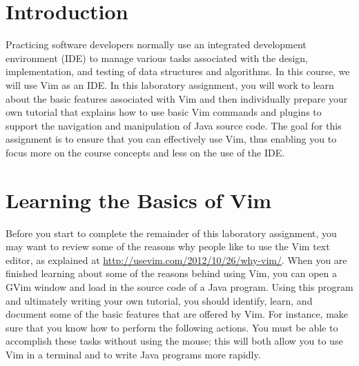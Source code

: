 


\usepackage[compact]{titlesec}



\section*{Introduction}

Practicing software developers normally use an integrated development environment (IDE) to manage various tasks
associated with the design, implementation, and testing of data structures and algorithms. In this course, we will use
Vim as an IDE.  In this laboratory assignment, you will work to learn about the basic features associated with Vim and
then individually prepare your own tutorial that explains how to use basic Vim commands and plugins to support the
navigation and manipulation of Java source code.  The goal for this assignment is to ensure that you can effectively use
Vim, thus enabling you to focus more on the course concepts and less on the use of the IDE.



\section*{Learning the Basics of Vim}

Before you start to complete the remainder of this laboratory assignment, you may want to review some of the reasons why
people like to use the Vim text editor, as explained at \url{http://usevim.com/2012/10/26/why-vim/}.  When you are
finished learning about some of the reasons behind using Vim, you can open a GVim window and load in the source code of
a Java program. Using this program and ultimately writing your own tutorial, you should identify, learn, and document
some of the basic features that are offered by Vim.  For instance, make sure that you know how to perform the following
actions. You must be able to accomplish these tasks without using the mouse; this will both allow you
to use Vim in a terminal and to write Java programs more rapidly.

